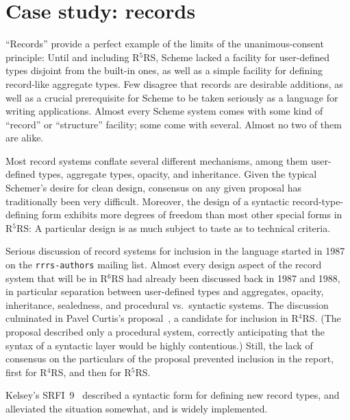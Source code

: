 \documentclass{acm_proc_article-sp}
\newcommand{\rn}[1]{R$^{#1}$RS}
\begin{document}
\section{Case study: records}
\label{sec:records}

``Records'' provide a perfect example of the limits of the
unanimous-consent principle: Until and including \rn{5}, Scheme lacked
a facility for user-defined types disjoint from the built-in ones, as
well as a simple facility for defining record-like aggregate types.  Few
disagree that records are desirable additions, as
well as a crucial prerequisite for Scheme to be taken seriously as a
language for writing applications.  Almost every Scheme system comes
with some kind of ``record'' or ``structure'' facility; some come with
several.  Almost no two of them are alike.

Most record systems conflate several different mechanisms, among them
user-defined types, aggregate types, opacity, and inheritance.  Given
the typical Schemer's desire for clean design, consensus on any given
proposal has traditionally been very difficult.  Moreover, the design of
a syntactic record-type-defining form exhibits more degrees of freedom
than most other special forms in \rn{5}: A particular design is as
much subject to taste as to technical criteria.

Serious discussion of record systems for inclusion in the language
started in 1987 on the \texttt{rrrs-authors} mailing list.  Almost
every design aspect of the record system that will be in \rn{6} had already
been discussed back in 1987 and 1988, in particular separation between
user-defined types and aggregates, opacity, inheritance, sealedness,
and procedural vs.\ syntactic systems.  The discussion culminated in
Pavel Curtis's proposal~\cite{Curtis1991}, a candidate for inclusion
in \rn{4}.  (The proposal described only a procedural system,
correctly anticipating that the syntax of a syntactic layer would be
highly contentious.)  Still, the lack of consensus on the particulars
of the proposal prevented inclusion in the report, first for \rn{4},
and then for \rn{5}.

Kelsey's SRFI~9~\cite{srfi9} described a syntactic form for
defining new record types, and alleviated the situation somewhat, and
is widely implemented.
\end{document}
